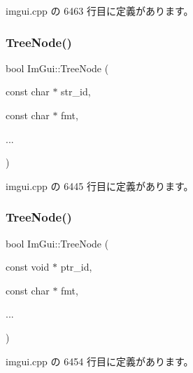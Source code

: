  imgui.\+cpp の 6463 行目に定義があります。

\mbox{\label{namespace_im_gui_a6e6e4de20291002430854cbd8cd58843}} 
\subsubsection{\texorpdfstring{Tree\+Node()}{TreeNode()}\hspace{0.1cm}{\footnotesize\ttfamily [2/3]}}
{\footnotesize\ttfamily bool Im\+Gui\+::\+Tree\+Node (\begin{DoxyParamCaption}\item[{const char $\ast$}]{str\+\_\+id,  }\item[{const char $\ast$}]{fmt,  }\item[{}]{... }\end{DoxyParamCaption})}



 imgui.\+cpp の 6445 行目に定義があります。

\mbox{\label{namespace_im_gui_a47f1421323f90fdd0a9cbfea2338b10f}} 
\subsubsection{\texorpdfstring{Tree\+Node()}{TreeNode()}\hspace{0.1cm}{\footnotesize\ttfamily [3/3]}}
{\footnotesize\ttfamily bool Im\+Gui\+::\+Tree\+Node (\begin{DoxyParamCaption}\item[{const void $\ast$}]{ptr\+\_\+id,  }\item[{const char $\ast$}]{fmt,  }\item[{}]{... }\end{DoxyParamCaption})}



 imgui.\+cpp の 6454 行目に定義があります。

\mbox{\label{namespace_im_gui_a918eabf70d288e93b2519ee1eac2c0b4}} 
